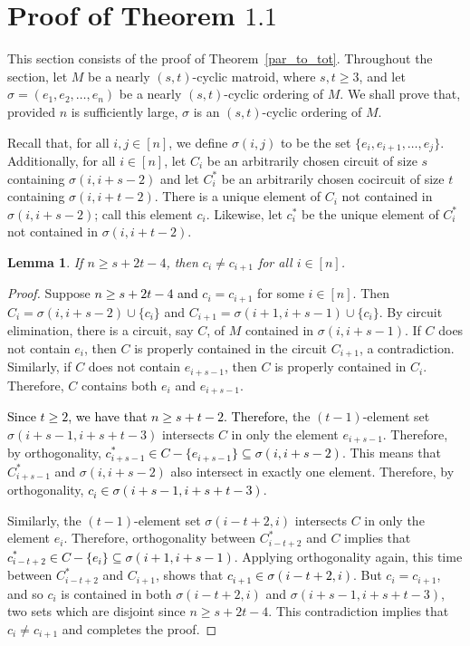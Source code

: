 \documentclass[11pt]{amsart}
\newtheorem{lemma}[theorem]{Lemma}
\newcommand{\blue}{\textcolor{black}}
\newcommand{\bloo}{\textcolor{black}}
\begin{document}
\section{Proof of Theorem $1.1$}
\label{cyclicthm}

This section consists of the proof of Theorem~\ref{par_to_tot}. Throughout the section, let $M$ be a nearly $(s, t)$-cyclic matroid, where $s, t\ge 3$, and let $\sigma = (e_1, e_2, \ldots, e_n)$ be a nearly $(s, t)$-cyclic ordering of $M$. We shall prove that, provided $n$ is sufficiently large, $\sigma$ is an $(s, t)$-cyclic ordering of $M$.

Recall that, for all $i, j\in [n]$, we define $\sigma(i, j)$ to be the set $\{e_i, e_{i+1}, \ldots, e_j\}$. Additionally, for all $i\in [n]$, let $C_i$ be an arbitrarily chosen circuit of size $s$ containing $\sigma(i, i+s-2)$ and let $C^*_i$ be an arbitrarily chosen cocircuit of size $t$ containing $\sigma(i, i+t-2)$. There is a unique element of $C_i$ not contained in $\sigma(i, i+s-2)$; call this element $c_i$. Likewise, let $c^*_i$ be the unique element of $C^*_i$ not contained in $\sigma(i, i+t-2)$.

\begin{lemma}
\label{consec_neq}
If $n \geq s+2t-4$, then $c_i \neq c_{i+1}$ for all $i \in [n]$.
\end{lemma}

\begin{proof}
Suppose \blue{$n \geq s+2t-4$ and} $c_i = c_{i+1}$ for some $i\in [n]$. Then $C_i = \sigma(i, i+s-2) \cup \{c_i\}$ and $C_{i+1} = \sigma(i+1, i+s-1) \cup \{c_i\}$. By circuit elimination, there is a circuit, say $C$, of $M$ contained in $\sigma(i, i+s-1)$. If $C$ does not contain $e_i$, then $C$ is properly contained in the circuit $C_{i+1}$, a contradiction. Similarly, if $C$ does not contain $e_{i+s-1}$, then $C$ is properly contained in $C_i$. Therefore, $C$ contains both $e_i$ and $e_{i+s-1}$.

\bloo{Since $t \geq 2$, we have that $n \geq s+t-2$. Therefore, } the $(t-1)$-element set $\sigma\left(i+s-1, i+s+t-3\right)$ intersects $C$ in only the element $e_{i+s-1}$. Therefore, by orthogonality, \bloo{$c^*_{i+s-1} \in C - \{e_{i+s-1}\} \subseteq \sigma(i, i+s-2)$}. This means that $C^*_{i+s-1}$ and $\sigma\left(i,i+s-2\right)$ also intersect in exactly one element. Therefore, by orthogonality, \bloo{$c_i \in \sigma(i+s-1,i+s+t-3)$}.

Similarly, the $(t-1)$-element set $\sigma(i-t+2,i)$ intersects $C$ in only the element $e_i$. Therefore, orthogonality between $C^*_{i-t+2}$ and $C$ implies that \bloo{$c^*_{i-t+2} \in C-\{e_i\} \subseteq \sigma(i+1,i+s-1)$}. Applying orthogonality again, this time between $C^*_{i-t+2}$ and $C_{i+1}$, shows that \bloo{$c_{i+1} \in \sigma(i-t+2,i)$}. But $c_i = c_{i+1}$, and so $c_i$ is contained in both $\sigma(i-t+2,i)$ and $\sigma(i+s-1,i+s+t-3)$, two sets which are disjoint since $n \geq s+2t-4$. This contradiction implies that $c_i \neq c_{i+1}$ and completes the proof.
\end{proof}
\end{document}
